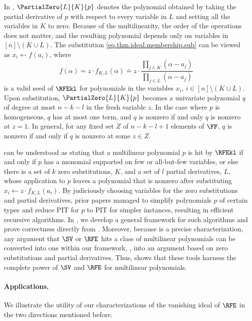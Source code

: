 \documentclass{toc}
\begin{document}
In ,
$\PartialZero{L}{K}{p}$ denotes the polynomial obtained by taking the partial derivative of $p$ with respect to every variable in $L$ and setting all the variables in $K$ to zero.
Because of the multilinearity, the order of the operations does not matter,
and the resulting polynomial depends only on variables in
\([n]\setminus (K\cup L)\). The substitution \eqref{eq.thm.ideal.membership.sub} can be viewed as $x_i \gets f(a_i)$, where 
\begin{equation*}
  f(\alpha) = z \cdot f_{K,L}(\alpha) \doteq z \cdot \frac{
      \prod_{j \in K} (\alpha - a_{j})
    }{
      \prod_{j \in L} (\alpha - a_{j})
    }
\end{equation*}
is a valid seed of \(\RFEkl\) for polynomials in the variables $x_i$, $i \in [n] \setminus (K \cup L)$.
Upon substitution, $\PartialZero{L}{K}{p}$ becomes a univariate polynomial $q$ of degree at most $n-k-l$ in the fresh variable $z$. In the case where $p$ is homogeneous, $q$ has at most one term, and $q$ is nonzero if and only $q$ is nonzero at $z=1$. In general, for any fixed set $Z$ of $n-k-l+1$ elements of $\FF$, $q$ is nonzero if and only if $q$ is nonzero at some $z \in Z$. 

 can be understood as stating that a multilinear polynomial \(p\) is hit by \(\RFEkl\)
if and only if
\(p\) has a monomial supported on few or all-but-few variables,
or else there is a set of $k$ zero substitutions, \(K\),
and a set of $l$ partial derivatives, \(L\),
whose application to \(p\) leaves a polynomial that is nonzero after
substituting \(x_i \gets z\cdot f_{K,L}(a_i)\).
By judiciously choosing variables for the zero substitutions and partial derivatives, prior papers managed to simplify polynomials $p$ of certain types and reduce PIT for $p$ to PIT for simpler instances, resulting in efficient recursive algorithms.
In ,
we develop a general framework for such algorithms
and prove correctness directly from .
Moreover,
because  is a precise characterization,
any argument that \(\SV\) or \(\RFE\) hits a class of multilinear polynomials
can be converted into one within our framework,
\ie, into an argument based on zero substitutions and partial derivatives.
Thus,  shows that these tools harness the complete
power of $\SV$ and $\RFE$ for multilinear polynomials.

\paragraph{Applications.}
We illustrate the utility of our characterizations of the vanishing ideal of
$\RFE$ in the two directions mentioned before.
\end{document}
